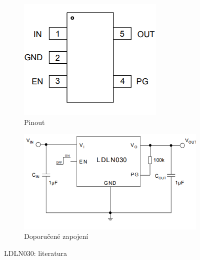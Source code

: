 \documentclass[a4paper, 12pt]{report}
\begin{document}
    \begin{figure}[h!]
        \centering
        \begin{subfigure}[b]{0.39\linewidth}
            \includegraphics[width=\linewidth]{images/ldln030_datasheet}
            \caption{Pinout}
        \end{subfigure}
        \begin{subfigure}[b]{0.49\linewidth}
            \includegraphics[width=\linewidth]{images/ldln030_datasheet2}
            \caption{Doporučené zapojení}
        \end{subfigure}
        \caption{LDLN030: literatura~\cite{stabilizator}}
        \label{fig:ldln030_datasheet}
    \end{figure}
\end{document}
